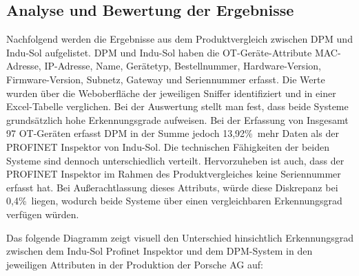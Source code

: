 \subsection{Analyse und Bewertung der Ergebnisse}

Nachfolgend werden die Ergebnisse aus dem Produktvergleich zwischen DPM und Indu-Sol aufgelistet. DPM und Indu-Sol haben die OT-Geräte-Attribute MAC-Adresse, IP-Adresse, Name, Gerätetyp, Bestellnummer, Hardware-Version, Firmware-Version, Subnetz, Gateway und Seriennummer erfasst. Die Werte wurden über die Weboberfläche der jeweiligen Sniffer identifiziert und in einer Excel-Tabelle verglichen. Bei der Auswertung stellt man fest, dass beide Systeme grundsätzlich hohe Erkennungsgrade aufweisen.  Bei der Erfassung von Insgesamt 97 OT-Geräten erfasst DPM in der Summe jedoch 13,92\%\ mehr Daten als der PROFINET Inspektor von Indu-Sol. 
Die technischen Fähigkeiten der beiden Systeme sind dennoch unterschiedlich verteilt. Hervorzuheben ist auch, dass der PROFINET Inspektor im Rahmen des Produktvergleiches keine Seriennummer erfasst hat. Bei Außerachtlassung dieses Attributs, würde diese Diskrepanz bei 0,4\%\ liegen, wodurch beide Systeme über einen vergleichbaren Erkennungsgrad verfügen würden.  


\noindent Das folgende Diagramm zeigt visuell den Unterschied hinsichtlich Erkennungsgrad zwischen dem Indu-Sol Profinet Inspektor und dem DPM-System in den jeweiligen Attributen in der Produktion der Porsche AG auf:



